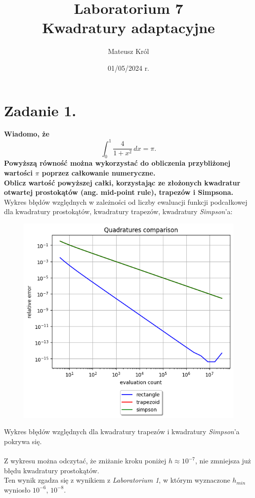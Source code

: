 \documentclass{article}
\title{%
Laboratorium 7\\
  \huge Kwadratury adaptacyjne}
\author{Mateusz Król}
\date{01/05/2024 r.}
\begin{document}
\maketitle

 
\section*{Zadanie 1.}
\textbf{Wiadomo, że $$ \int_{0}^{1} \frac{4}{1+x^2} \,dx = \pi.$$
\quad
Powyższą równość można wykorzystać do obliczenia przybliżonej
wartości $\pi$ poprzez całkowanie numeryczne. \\
\null\quad
Oblicz wartość powyższej całki, korzystając ze
złożonych kwadratur otwartej prostokątów (ang. mid-point rule), 
trapezów i Simpsona.}
\newpage
Wykres błędów względnych w zależności od liczby ewaluacji
funkcji podcałkowej dla kwadratury prostokątów, kwadratury trapezów,
kwadratury \textit{Simpson}'a:
\begin{figure}[H]
  \includegraphics[width=\linewidth]{figures/quad.png}
\end{figure}
Wykres błędów względnych dla kwadratury trapezów i kwadratury \textit{Simpson}'a
pokrywa się.
\\\\
\null\quad
Z wykresu można odczytać, że zniżanie kroku poniżej $h \approx 10^{-7}$, 
nie zmniejsza już błędu kwadratury prostokątów. \\
Ten wynik zgadza się z wynikiem z \textit{Laboratorium 1}, w którym
wyznaczone $h_{min}$ wyniosło $10^{-6}$, $10^{-8}$.
\end{document}
